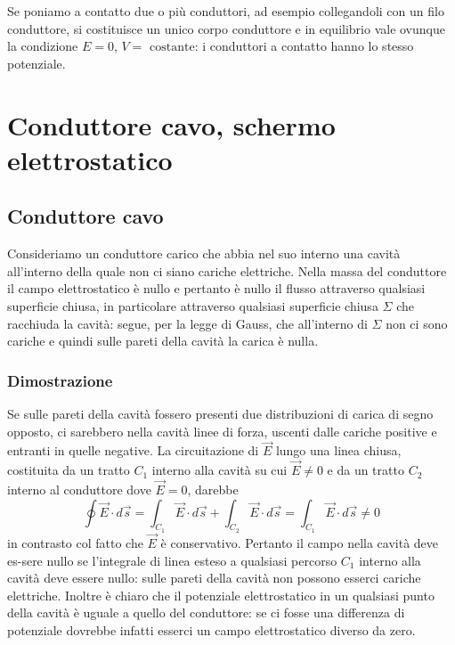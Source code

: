 \documentclass[class=book, crop=false, oneside, 12pt]{standalone}
\begin{document}
Se poniamo a contatto due o più conduttori, ad esempio collegandoli con un filo conduttore, si costituisce un unico corpo conduttore e in equilibrio vale ovunque la condizione \(E = 0\), \(V =\text{ costante}\): i conduttori a contatto hanno lo stesso potenziale. 

\section{Conduttore cavo, schermo elettrostatico}

\subsection{Conduttore cavo}

Consideriamo un conduttore carico che abbia nel suo interno una cavità all'interno della quale non ci siano cariche elettriche. 
Nella massa del conduttore il campo elettrostatico è nullo e pertanto è nullo il flusso attraverso qualsiasi superficie chiusa, in particolare attraverso qualsiasi superficie chiusa \(\Sigma\) che racchiuda la cavità: segue, per la legge di Gauss, che all'interno di \(\Sigma\) non ci sono cariche e quindi sulle pareti della cavità la carica è nulla.

\subsubsection{Dimostrazione}

Se sulle pareti della cavità fossero presenti due distribuzioni di carica di segno opposto, ci sarebbero nella cavità linee di forza, uscenti dalle cariche positive e entranti in quelle negative. 
La circuitazione di \(\overrightarrow{E}\) lungo una linea chiusa, costituita da un tratto \(C_1\) interno alla cavità su cui \(\overrightarrow{E} \neq 0\) e da un tratto \(C_2\) interno al conduttore dove \(\overrightarrow{E} = 0\), darebbe
\begin{equation*}
    \oint \overrightarrow{E} \cdot d \overrightarrow{s} = \int_{C_1} \overrightarrow{E} \cdot d \overrightarrow{s} + \int_{C_2} \overrightarrow{E} \cdot d \overrightarrow{s} = \int_{C_1} \overrightarrow{E} \cdot d \overrightarrow{s} \neq 0
\end{equation*}
in contrasto col fatto che \(\overrightarrow{E}\) è conservativo. 
Pertanto il campo nella cavità deve es-sere nullo se l'integrale di linea esteso a qualsiasi percorso \(C_1\) interno alla cavità deve essere nullo: sulle pareti della cavità non possono esserci cariche elettriche.
Inoltre è chiaro che il potenziale elettrostatico in un qualsiasi punto della cavità è uguale a quello del conduttore: se ci fosse una differenza di potenziale dovrebbe infatti esserci un campo elettrostatico diverso da zero. 
\end{document}
